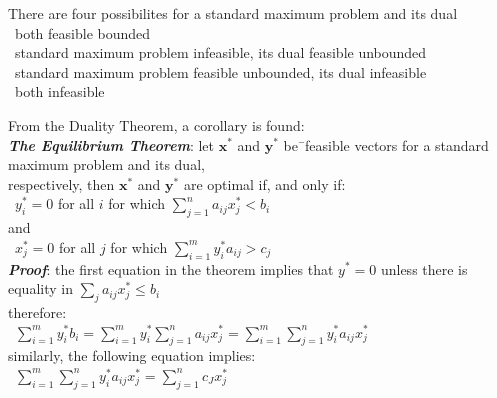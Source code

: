 \documentclass[10pt,letterpaper]{scrartcl}
\newcommand{\boph}[1]{\emph{\textbf{#1}}} %
\newcommand{\tbul}{\textbullet}
\begin{document}
There are four possibilites for a standard maximum problem and its dual \\
\tbul\ both feasible bounded \\
\tbul\ standard maximum problem infeasible, its dual feasible unbounded \\
\tbul\ standard maximum problem feasible unbounded, its dual infeasible \\
\tbul\ both infeasible \\
\begin{tabbing}
From the Duality Theorem, a corollary is found: \\
\boph{The Equilibrium Theorem}: let $\mathbf{x^{*}}$ and $\mathbf{y^{*}}$ be\=\ feasible vectors for a standard maximum problem and its dual, \\ respectively, then $\mathbf{x^{*}}$ and $\mathbf{y^{*}}$ are optimal if, and only if: \\
\>\ $y^{*}_i = 0$ for all $i$ for which $\displaystyle\sum_{j=1}^{n}a_{ij}x^{*}_j < b_i$ \\
and \\
\>\ $x^{*}_j = 0$ for all $j$ for which $\displaystyle\sum_{i=1}^{m}y^{*}_ia_{ij} > c_j$  \\
\boph{Proof}: the first equation in the theorem implies that $y^{*}=0$ unless there is equality in $\displaystyle\sum_j a_{ij}x^{*}_j\leq b_i$ \\
therefore: \\
\>\ $\displaystyle\sum_{i=1}^{m}y^{*}_{i}b_i = \sum_{i=1}^{m}y^{*}_i\sum_{j=1}^{n}a_{ij}x^{*}_j = \sum_{i=1}^{m}\sum_{j=1}^{n}y^{*}_ia_{ij}x^{*}_j$ \\
similarly, the following equation implies: \\
\>\ $\displaystyle\sum_{i=1}^m\sum_{j=1}^ny^*_ia_{ij}x^*_j=\sum_{j=1}^nc_Jx^*_j$ \\
\end{tabbing}
\end{document}
